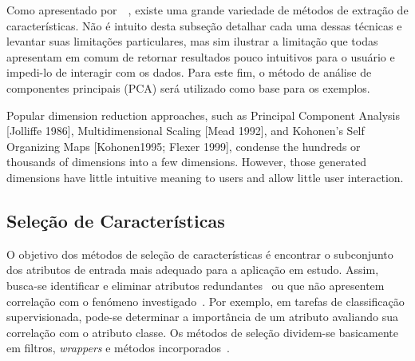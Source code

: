 Como apresentado por~\citeauthor{Maaten2009}~\cite{Maaten2009}, existe uma grande variedade de métodos de extração de características. Não é intuito desta subseção detalhar cada uma dessas técnicas e levantar suas limitações particulares, mas sim ilustrar a limitação que todas apresentam em comum de retornar resultados pouco intuitivos para o usuário e impedi-lo de interagir com os dados. Para este fim, o método de análise de componentes principais (PCA) será utilizado como base para os exemplos.

Popular dimension reduction approaches, such as Principal Component Analysis [Jolliffe 1986], Multidimensional Scaling [Mead 1992], and Kohonen’s Self Organizing Maps [Kohonen1995; Flexer 1999], condense the hundreds or thousands of dimensions into a few dimensions. However, those generated dimensions have little intuitive meaning to users and allow little user interaction.




\subsection{Seleção de Características} 

O objetivo dos métodos de seleção de características é encontrar o subconjunto  dos atributos de entrada mais adequado para a aplicação em estudo. 
Assim, busca-se identificar e eliminar atributos redundantes~\cite{Kohavi1997} ou que não apresentem correlação com o fenómeno investigado~\cite{Nilsson2007}. 
Por exemplo, em tarefas de classificação supervisionada, pode-se determinar a importância de um atributo avaliando sua correlação com o atributo classe. Os métodos de seleção dividem-se basicamente em filtros, \emph{wrappers} e métodos incorporados~\cite{Guyon2003}. 

